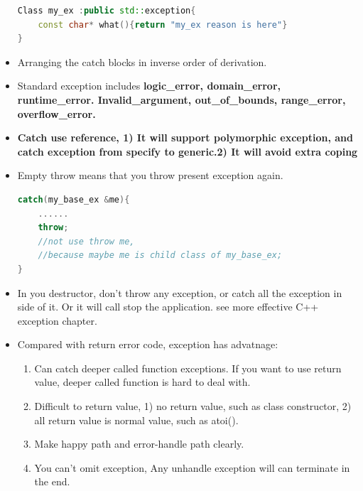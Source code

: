\documentclass[a4paper,11pt,twoside]{book}
\begin{document}
\begin{itemize}
\begin{lstlisting}[frame=single, language=c++]
Class my_ex :public std::exception{
	const char* what(){return "my_ex reason is here"}
}
\end{lstlisting}
	
	\item Arranging the catch blocks in inverse order of derivation.
	
	\item Standard exception includes \textbf{logic\_error, domain\_error,  runtime\_error.  Invalid\_argument, out\_of\_bounds, range\_error, overflow\_error.}
	
	\item \textbf{Catch use reference, 1) It will support polymorphic exception, and catch exception from specify to generic.2) It will avoid extra coping}
	
\item Empty throw means that you throw present exception again.
	\begin{lstlisting}[frame=single, language=c++]
catch(my_base_ex &me){
	......
	throw;
	//not use throw me,
	//because maybe me is child class of my_base_ex;
}
	\end{lstlisting}
	
	\item In you destructor, don't throw any exception, or catch all the exception in side of it. Or it will call stop the application. see more effective C++ exception chapter.
	
	\item Compared with return error code, exception has advatnage:
	\begin{enumerate}
		\item  Can catch deeper called function exceptions. If you want to use return value, deeper called function is hard to deal with.
		
		\item Difficult to return value, 1) no return value, such as class constructor, 2) all return value is normal value, such as atoi().
		
		\item Make happy path and error-handle path clearly.
		
		\item You can't omit exception, Any unhandle exception will can terminate in the end.
	\end{enumerate}
	
\end{itemize}
\end{document}
